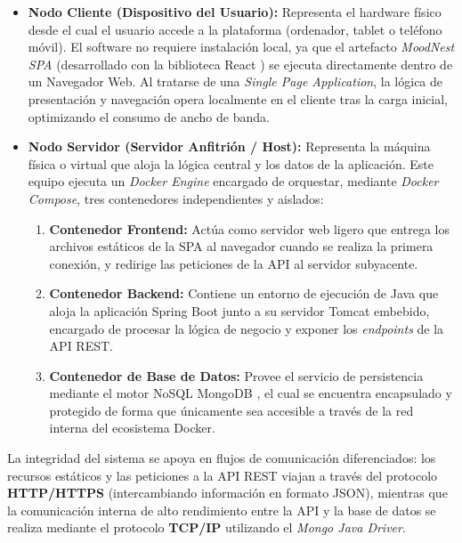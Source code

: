 \begin{itemize}
    \item \textbf{Nodo Cliente (Dispositivo del Usuario):} Representa el hardware físico desde el cual el usuario accede a la plataforma (ordenador, tablet o teléfono móvil). El software no requiere instalación local, ya que el artefacto \textit{MoodNest SPA} (desarrollado con la biblioteca React \cite{bib:react}) se ejecuta directamente dentro de un Navegador Web. Al tratarse de una \textit{Single Page Application}, la lógica de presentación y navegación opera localmente en el cliente tras la carga inicial, optimizando el consumo de ancho de banda.
    
    \item \textbf{Nodo Servidor (Servidor Anfitrión / Host):} Representa la máquina física o virtual que aloja la lógica central y los datos de la aplicación. Este equipo ejecuta un \textit{Docker Engine} encargado de orquestar, mediante \textit{Docker Compose}, tres contenedores independientes y aislados:
    \begin{enumerate}
        \item \textbf{Contenedor Frontend:} Actúa como servidor web ligero que entrega los archivos estáticos de la SPA al navegador cuando se realiza la primera conexión, y redirige las peticiones de la API al servidor subyacente.
        \item \textbf{Contenedor Backend:} Contiene un entorno de ejecución de Java que aloja la aplicación Spring Boot \cite{bib:springboot} junto a su servidor Tomcat embebido, encargado de procesar la lógica de negocio y exponer los \textit{endpoints} de la API REST.
        \item \textbf{Contenedor de Base de Datos:} Provee el servicio de persistencia mediante el motor NoSQL MongoDB \cite{bib:mongodb}, el cual se encuentra encapsulado y protegido de forma que únicamente sea accesible a través de la red interna del ecosistema Docker.
    \end{enumerate}
\end{itemize}

La integridad del sistema se apoya en flujos de comunicación diferenciados: los recursos estáticos y las peticiones a la API REST viajan a través del protocolo \textbf{HTTP/HTTPS} (intercambiando información en formato JSON), mientras que la comunicación interna de alto rendimiento entre la API y la base de datos se realiza mediante el protocolo \textbf{TCP/IP} utilizando el \textit{Mongo Java Driver}.

